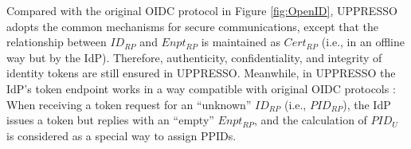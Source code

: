 %

Compared with the original OIDC protocol in Figure \ref{fig:OpenID},
UPPRESSO adopts the common mechanisms for secure communications,
except that the relationship between $ID_{RP}$ and $Enpt_{RP}$ is maintained as $Cert_{RP}$ (i.e., in an offline way but by the IdP).
Therefore, authenticity, confidentiality, and integrity of identity tokens are still ensured in UPPRESSO.
Meanwhile, in UPPRESSO the IdP's token endpoint 
    works in a way compatible with original OIDC protocols \cite{rfc6749,OpenIDConnect}:
        When receiving a token request for an ``unknown'' $ID_{RP}$ (i.e., $PID_{RP}$),
the IdP issues a token but replies with an ``empty'' $Enpt_{RP}$,
    and the calculation of $PID_{U}$ is considered as a special way to assign PPIDs.


